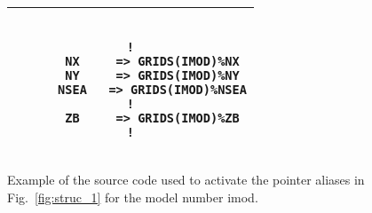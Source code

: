 \begin{figure}
\begin{center} \begin{tabular}{|c|} \hline
\begin{minipage}[t]{4.5in}
\begin{verbatim}

!
      NX     => GRIDS(IMOD)%NX
      NY     => GRIDS(IMOD)%NY
      NSEA   => GRIDS(IMOD)%NSEA
!
      ZB     => GRIDS(IMOD)%ZB
!

\end{verbatim}
\end{minipage} \\ \hline
\end{tabular} \end{center}

\caption{Example of the source code used to activate the pointer
         aliases in Fig.~\ref{fig:struc_1} for the model number {\F
         imod}.}
\label{fig:struc_2}

\botline
\end{figure}
